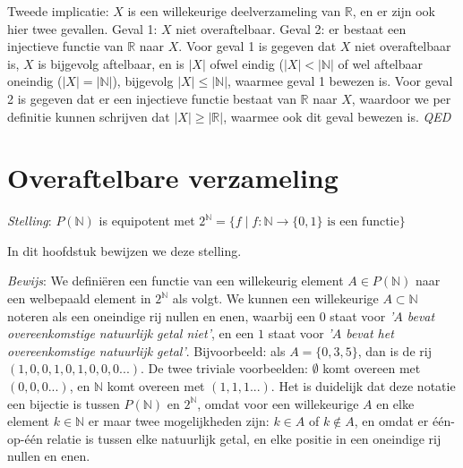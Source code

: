 \documentclass[hidelinks,11pt,a4paper]{article}
\begin{document}
Tweede implicatie: $X$ is een willekeurige deelverzameling van  $\mathbb{R}$, en er zijn ook hier twee gevallen. 
Geval 1: $X$ niet overaftelbaar. 
Geval 2: er bestaat een injectieve functie van $\mathbb{R}$ naar $X$. 
Voor geval 1 is gegeven dat $X$ niet overaftelbaar is, $X$ is bijgevolg aftelbaar, en is $|X|$ ofwel eindig ($|X| < |\mathbb{N}|$ of wel aftelbaar oneindig ($|X| = |\mathbb{N}|$), bijgevolg $|X| \leq |\mathbb{N}| $, waarmee geval 1 bewezen is. 
Voor geval 2 is gegeven dat er een injectieve functie bestaat van $\mathbb{R}$ naar $X$, waardoor we per definitie kunnen schrijven dat $|X| \geq |\mathbb{R}|$, waarmee ook dit geval bewezen is. 
\emph{QED} 

\section{Overaftelbare verzameling}

\emph{Stelling}: $ P(\mathbb{N})$ is equipotent met $2^{\mathbb{N}} = \{ f \mid f : \mathbb{N} \rightarrow \{0,1\} \text{ is een functie}  \} $

In dit hoofdstuk bewijzen we deze stelling. 

\emph{Bewijs}: 
We defini\"eren een functie van een willekeurig element $A \in P(\mathbb{N}) $ naar een welbepaald element in $2^{\mathbb{N}}$ als volgt. We kunnen een willekeurige $A \subset \mathbb{N}$ noteren als een oneindige rij nullen en enen, waarbij een $0$ staat voor \emph{'$A$ bevat overeenkomstige natuurlijk getal niet'}, en een $1$ staat voor \emph{'$A$ bevat het overeenkomstige natuurlijk getal'}. Bijvoorbeeld: als $A = \{0, 3, 5\}$, dan is de rij $(1,0,0,1,0,1,0,0,0...)$. De twee triviale voorbeelden: $\emptyset$ komt overeen met $(0,0,0...)$, en $\mathbb{N}$ komt overeen met $(1,1,1...)$. 
Het is duidelijk dat deze notatie een bijectie is tussen $P(\mathbb{N})$ en $2^{\mathbb{N}}$, omdat voor een willekeurige $A$ en elke element $k \in \mathbb{N}$ er maar twee mogelijkheden zijn: $k \in A$ of $k \notin A$, en omdat er \'e\'en-op-\'e\'en relatie is tussen elke natuurlijk getal, en elke positie in een oneindige rij nullen en enen. 

\end{document}
